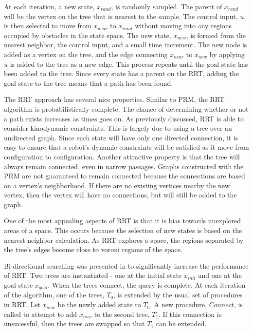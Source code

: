 \documentclass[10pt,conference]{ieeeconf}
\begin{document}
At each iteration, a new state, $x_{rand}$, is randomly sampled. The parent of $x_{rand}$ will be the vertex on the tree that is nearest to the sample. The control input, $u$, is then selected to move from $x_{near}$ to $x_{rand}$ without moving into any regions occupied by obstacles in the state space. The new state, $x_{new}$, is formed from the nearest neighbor, the control input, and a small time increment. The new node is added as a vertex on the tree, and the edge connecting $x_{near}$ to $x_{new}$ by applying $u$ is added to the tree as a new edge. This process repeats until the goal state has been added to the tree. Since every state has a parent on the RRT, adding the goal state to the tree means that a path has been found. 

The RRT approach has several nice properties. Similar to PRM, the RRT algorithm is probabilistically complete. The chance of determining whether or not a path exists increases as times goes on. As previously discussed, RRT is able to consider kinodynamic constraints. This is largely due to using a tree over an undirected graph. Since each state will have only one directed connection, it is easy to ensure that a robot's dynamic constraints will be satisfied as it move from configuration to configuration. Another attractive property is that the tree will always remain connected, even in narrow passages. Graphs constructed with the PRM are not guaranteed to remain connected because the connections are based on a vertex's neighborhood. If there are no existing vertices nearby the new vertex, then the vertex will have no connections, but will still be added to the graph.

One of the most appealing aspects of RRT is that it is bias towards unexplored areas of a space. This occurs because the selection of new states is based on the nearest neighbor calculation. As RRT explores a space, the regions separated by the tree's edges become close to voroni regions of the space.

Bi-directional searching was presented in \cite{kuffner2000rrt} to significantly increase the performance of RRT. Two trees are instantiated - one at the initial state $x_{init}$ and one at the goal state $x_{goal}$. When the trees connect, the query is complete. At each iteration of the algorithm, one of the trees, $T_0$, is extended by the usual set of procedures in RRT. Let $x_{new}$ be the newly added state to $T_0$. A new procedure, $Connect$, is called to attempt to add $x_{new}$ to the second tree, $T_1$. If this connection is unsucessful, then the trees are swapped so that $T_1$ can be extended.
\end{document}
